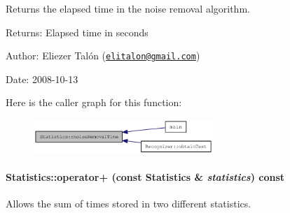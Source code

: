 Returns the elapsed time in the noise removal algorithm. 

\begin{Desc}
\item[Returns:]Elapsed time in seconds\end{Desc}
\begin{Desc}
\item[Author:]Eliezer Talón (\href{mailto:elitalon@gmail.com}{\tt elitalon@gmail.com}) \end{Desc}
\begin{Desc}
\item[Date:]2008-10-13 \end{Desc}


Here is the caller graph for this function:\nopagebreak
\begin{figure}[H]
\begin{center}
\leavevmode
\includegraphics[width=192pt]{class_statistics_2851ad08e1bd9604fe76c78cccc50e84_icgraph}
\end{center}
\end{figure}
\hypertarget{class_statistics_cb07c98a63e07fdb1476ffb282b84676}{
\paragraph[{operator+}]{ Statistics::operator+ (const {\bf Statistics} \& {\em statistics}) const}\hfill}
\label{class_statistics_cb07c98a63e07fdb1476ffb282b84676}


Allows the sum of times stored in two different statistics. 

